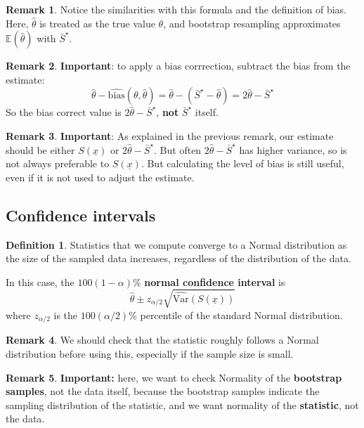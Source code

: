 \documentclass[12pt,a4paper]{article}
\theoremstyle{definition}
\newtheorem{definition}{Definition}[subsection]
\newtheorem*{remark}{Remark}
\begin{document}
\begin{remark}
	Notice the similarities with this formula and the definition of bias. Here, $\hat{\theta}$ is treated as the true value $\theta$, and bootstrap resampling approximates $\mathbb{E}(\hat{\theta})$ with $\bar{S}^{\star}$.
\end{remark}

\begin{remark}
	\textbf{Important}: to apply a bias corrrection, subtract the bias from the estimate:
	\[
		\hat{\theta} - \widehat{\text{bias}}(\theta, \hat{\theta}) = \hat{\theta} - (\bar{S}^{\star} - \hat{\theta}) = 2 \hat{\theta} - \bar{S}^{\star}
	\]
	So the bias correct value is $2 \hat{\theta} - \bar{S}^{\star}$, \textbf{not} $\bar{S}^{\star}$ itself.
\end{remark}

\begin{remark}
	\textbf{Important}: As explained in the previous remark, our estimate should be either $S(\underline{x})$ or $2 \hat{\theta} - \bar{S}^{\star}$. But often $2 \hat{\theta} - \bar{S}^{\star}$ has higher variance, so is not always preferable to $S(\underline{x})$. But calculating the level of bias is still useful, even if it is not used to adjust the estimate.
\end{remark}

\subsection{Confidence intervals}

\begin{definition}
	Statistics that we compute converge to a Normal distribution as the size of the sampled data increases, regardless of the distribution of the data.

	In this case, the $100(1 - \alpha)\%$ \textbf{normal confidence interval} is
	\[
		\hat{\theta} \pm z_{\alpha / 2} \sqrt{\widehat{\text{Var}}(S(\underline{x}))}
	\]
	where $z_{\alpha / 2}$ is the $100(\alpha / 2)\%$ percentile of the standard Normal distribution.
\end{definition}

\begin{remark}
	We should check that the statistic roughly follows a Normal distribution before using this, especially if the sample size is small.
\end{remark}

\begin{remark}
	\textbf{Important:} here, we want to check Normality of the \textbf{bootstrap samples}, not the data itself, because the bootstrap samples indicate the sampling distribution of the statistic, and we want normality of the \textbf{statistic}, not the data.
\end{remark}
\end{document}
